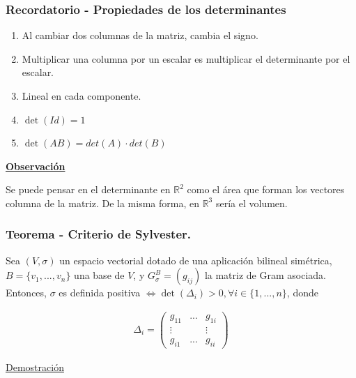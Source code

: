 \documentclass[12pt, a4paper, ones, notitlepage, openany,titlepage]{article}
\newcommand{\demostracion}{\noindent\underline{Demostración}}
\newcommand{\observacion}{\noindent\underline{\textbf{Observación}}}
\begin{document}
\subsubsection{Recordatorio - Propiedades de los determinantes}
\begin{enumerate}[label=(\arabic*)]
	\item Al cambiar dos columnas de la matriz, cambia el signo.
	\item Multiplicar una columna por un escalar es multiplicar el determinante por el escalar.
	\item Lineal en cada componente.
	\item $\det(Id) = 1$
	\item $\det(AB) = det(A) \cdot det(B)$
\end{enumerate}
\observacion

Se puede pensar en el determinante en $\mathbb{R}^2$ como el área que forman los vectores columna de la matriz. De la misma forma, en $\mathbb{R}^3$ sería el volumen.

\subsubsection{Teorema - Criterio de Sylvester.}
Sea $(V,\sigma)$ un espacio vectorial dotado de una aplicación bilineal simétrica, $B = \{v_1,...,v_n\}$ una base de $V$, y $G_\sigma^B = (g_{ij})$ la matriz de Gram asociada. Entonces, $\sigma$ es definida positiva $\Longleftrightarrow \det(\Delta_i) > 0, \forall i \in \{1,...,n\}$, donde

\begin{align*}
	\Delta_i = \left(
	\begin{matrix}
		g_{11} & ... & g_{1i} \\
		\vdots &     & \vdots \\
		g_{i1} & ... & g_{ii}
	\end{matrix}
	\right)
\end{align*}

\demostracion
\end{document}
